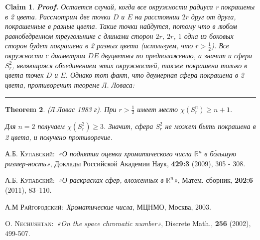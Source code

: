 \documentclass{report}%
\newtheorem{theorem}{Theorem}
\newtheorem{claim}[theorem]{Claim}
\newenvironment{proof}[1][Proof]{\textbf{#1.} }{\ \rule{0.5em}{0.5em}}
\begin{document}
\begin{claim}
\begin{proof}
				Остается случай, когда все окружности радиуса r покрашены в 2 цвета.
				Рассмотрим две точки $D$ и $E$ на расстоянии $2r$ друг от друга, покрашенные в разные цвета.
				Такие точки найдутся, потому что в любом равнобедренном треугольнике с длинами сторон $2r$, $2r$, $1$
				одна из боковых сторон будет покрашена в 2 разных цвета (используем, что $r > \frac{1}{2}$).
				Все окружности с диаметром $DE$ двуцветны по предположению, а значит и сфера $S_r^2$,
				являющаяся объединением этих окружностей, также покрашена только в цвета точек $D$ и $E$.
				Однако тот факт, что двумерная сфера покрашена в 2 цвета, противоречит теореме Л. Ловаса:
		\end{proof}
\end{claim}

\begin{theorem}(Л.Ловас 1983 г).
		При $r > \frac{1}{2}$ имеет место $\chi(S_r^n) \geq n + 1$.
		
		Для $n = 2$ получаем  $\chi(S_r^2) \geq 3$.
		Значит, сфера $S_r^2$ не может быть покрашена в 2 цвета, и получено противоречие.
\end{theorem}

\begin{thebibliography}{4}

 \textsc{А.Б. Купавский}:\ \textit{«О поднятии оценки хроматического числа
 $\mathbb{R}^n$ в б\'{о}льшую размер-ность»},  Доклады Российской Академии Наук, \textbf{429:3} (2009), 305 - 308.

 \textsc{А.Б. Купавский}:\ \textit{«О раскрасках сфер, вложенных в $\mathbb{R}^n$»},
Матем. сборник, \textbf{202:6} (2011), 83–110.

 \textsc{А.М Райгородский}:\ \textit{Хроматические числа}, МЦНМО, Москва, 2003.

 \textsc{O. Nechushtan}:\ \textit{«On the space chromatic number»},
 Discrete Math., \textbf{256} (2002), 499-507.

\end{thebibliography}
\end{document}

